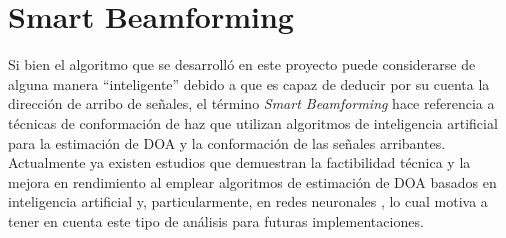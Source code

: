 \section{Smart Beamforming}\label{subc_smartbeamforming}
Si bien el algoritmo que se desarrolló en este proyecto puede considerarse de alguna manera ``inteligente'' debido a que es capaz de deducir por su cuenta la dirección de arribo de señales, el término \emph{Smart Beamforming} hace referencia a técnicas de conformación de haz que utilizan algoritmos de inteligencia artificial para la estimación de DOA y la conformación de las señales arribantes.
Actualmente ya existen estudios que demuestran la factibilidad técnica y la mejora en rendimiento al emplear algoritmos de estimación de DOA basados en inteligencia artificial y, particularmente, en redes neuronales \cite{bib:smart_beamforming}, lo cual motiva a tener en cuenta este tipo de análisis para futuras implementaciones.